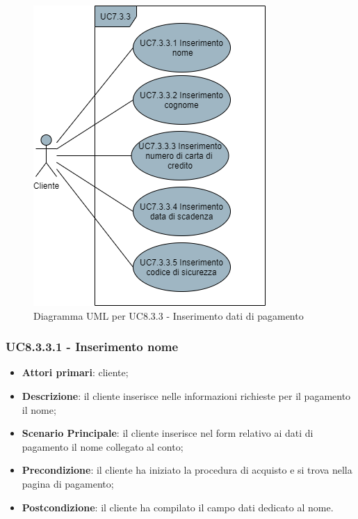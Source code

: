 \begin{figure}[H]
\centering
\includegraphics[scale=0.6]{res/UseCase/Immagini/InserimentoDatiPagamento}
\caption{Diagramma UML per UC8.3.3 - Inserimento dati di pagamento}
\end{figure}

\subsubsection{UC8.3.3.1 - Inserimento nome}
\begin{itemize}
\item \textbf{Attori primari}: cliente;
\item \textbf{Descrizione}: il cliente inserisce nelle informazioni richieste per il pagamento il nome;
\item \textbf{Scenario Principale}: il cliente inserisce nel form relativo ai dati di pagamento il nome collegato al conto;
\item \textbf{Precondizione}: il cliente ha iniziato la procedura di acquisto e si trova nella pagina di pagamento;
\item \textbf{Postcondizione}: il cliente ha compilato il campo dati dedicato al nome.
\end{itemize}

